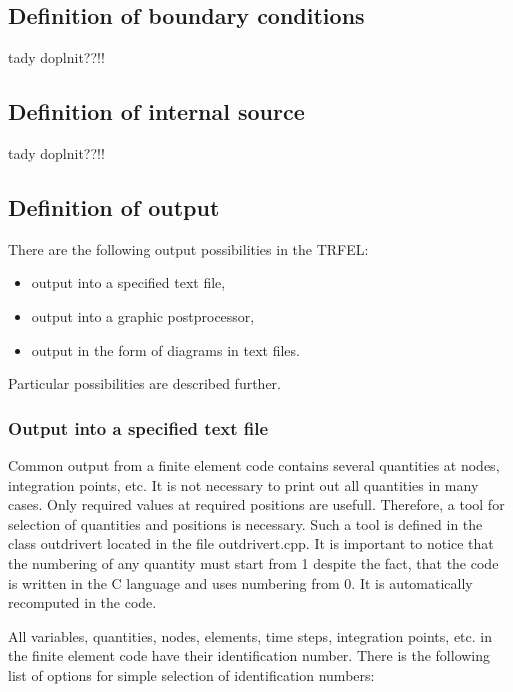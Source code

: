 \subsection{Definition of boundary conditions}


tady doplnit??!!


\subsection{Definition of internal source}


tady doplnit??!!



\subsection{Definition of output}

There are the following output possibilities in the TRFEL:
\begin{itemize}
\item output into a specified text file,
\item output into a graphic postprocessor,
\item output in the form of diagrams in text files.
\end{itemize}
Particular possibilities are described further.


\subsubsection{Output into a specified text file}
Common output from a finite element code contains several quantities at nodes, integration points,
etc. It is not necessary to print out all quantities in many cases. Only required values at
required positions are usefull. Therefore, a tool for selection of quantities and positions
is necessary. Such a tool is defined in the class {\sf outdrivert} located in the file outdrivert.cpp.
It is important to notice that the numbering of any quantity must start from 1 despite the fact, that
the code is written in the C language and uses numbering from 0. It is automatically recomputed in the
code.

All variables, quantities, nodes, elements, time steps, integration points, etc. in the finite element code have
their identification number. There is the following list of options for simple selection of
identification numbers:

